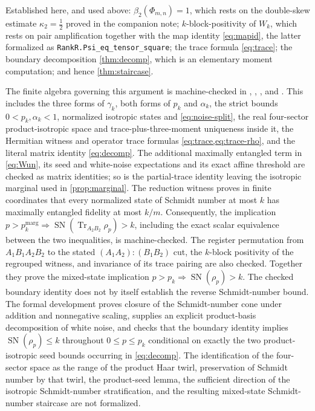 \documentclass[11pt,reqno]{amsart}
\theoremstyle{plain}
\theoremstyle{remark}
\begin{document}
Established here, and used above: $\beta_2(\Phi_{m,n})=1$, which rests on the
double-skew estimate $\kappa_2=\frac12$ proved in the companion note;
$k$-block-positivity of $W_k$, which rests on pair amplification together with
the map identity \cref{eq:mapid}, the latter formalized as
\texttt{RankR.Psi\_eq\_tensor\_square}; the trace formula \cref{eq:trace}; the
boundary decomposition \cref{thm:decomp}, which is an elementary moment
computation; and hence \cref{thm:staircase}.

The finite algebra governing this argument is machine-checked in
,
,
, and
.  This includes the three forms of
$\gamma_k$, both forms of $p_k$ and $\alpha_k$, the strict bounds
$0<p_k,\alpha_k<1$, normalized isotropic states and
\cref{eq:noise-split}, the real four-sector product-isotropic space and
trace-plus-three-moment uniqueness inside it, the Hermitian witness and
operator trace formulas \cref{eq:trace,eq:trace-rho}, and the literal matrix
identity \cref{eq:decomp}.  The additional maximally entangled term in
\cref{eq:Wun}, its seed and white-noise expectations and its exact affine
threshold are checked as matrix identities; so is the partial-trace identity
leaving the isotropic marginal used in \cref{prop:marginal}.  The reduction
witness proves in finite coordinates that every normalized state of Schmidt
number at most \(k\) has maximally entangled fidelity at most \(k/m\).
Consequently, the implication
\(p>p_k^{\mathrm{marg}}\Rightarrow
\operatorname{SN}(\operatorname{Tr}_{A_2B_2}\rho_p)>k\), including the exact
scalar equivalence between the two inequalities, is machine-checked.  The
register permutation from \(A_1B_1A_2B_2\) to the stated
\((A_1A_2):(B_1B_2)\) cut, the \(k\)-block positivity of the regrouped
witness, and invariance of its trace pairing are also checked.  Together they
prove the mixed-state implication
\(p>p_k\Rightarrow\operatorname{SN}(\rho_p)>k\).  The checked boundary
identity does not by itself establish the reverse Schmidt-number bound.
The formal development proves closure of the Schmidt-number cone under
addition and nonnegative scaling, supplies an explicit product-basis
decomposition of white noise, and checks that the boundary identity implies
\(\operatorname{SN}(\rho_p)\leq k\) throughout \(0\leq p\leq p_k\)
conditional on exactly the two product-isotropic seed bounds occurring in
\cref{eq:decomp}.
The identification of the four-sector space as the range of the product Haar
twirl, preservation of Schmidt number by that twirl, the product-seed lemma,
the sufficient direction of the isotropic Schmidt-number stratification, and
the resulting mixed-state Schmidt-number staircase are not formalized.
\end{document}
